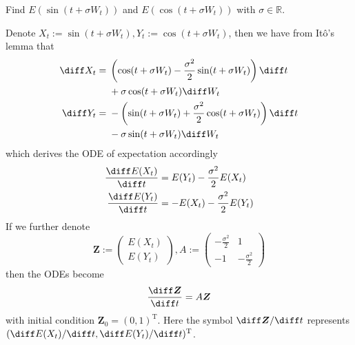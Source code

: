     \problem
    \begin{question}
        Find $E(\sin (t+\sigma W_t))$ and $E(\cos (t+\sigma W_t))$ with $\sigma \in\mathbb R$.
    \end{question}
    \newcommand{\X}{\boldsymbol Z}
    Denote $X_t:=\sin(t+\sigma W_t),Y_t:=\cos(t+\sigma W_t)$,
    then we have from It\^o's lemma that
    \[\begin{aligned}
        \diff X_t&=
        \begin{aligned}[t]
        &\left(\cos(t+\sigma W_t)-\frac{\sigma^2}{2}\sin(t+\sigma W_t)\right)\diff t\\
        &+\sigma\cos(t+\sigma W_t)\diff W_t\\
        \end{aligned}\\
        \diff Y_t&=
        \begin{aligned}[t]
        &-\left(\sin(t+\sigma W_t)+\frac{\sigma^2}{2}\cos(t+\sigma W_t)\right)\diff t\\
        &-\sigma\sin(t+\sigma W_t)\diff W_t
        \end{aligned}
    \end{aligned}\]
    which derives the ODE of expectation accordingly
    \[\begin{aligned}
        \frac{\diff E(X_t)}{\diff t}&=E(Y_t)-\frac{\sigma^2}{2}E(X_t)\\
        \frac{\diff E(Y_t)}{\diff t}&=-E(X_t)-\frac{\sigma^2}{2}E(Y_t)
    \end{aligned}\]
    If we further denote
    \[\X:=\begin{pmatrix}
        E(X_t)\\
        E(Y_t)
    \end{pmatrix},
    A:=\begin{pmatrix}
        -\frac{\sigma^2}{2} & 1\\
        -1 & -\frac{\sigma^2}{2}
    \end{pmatrix}\]
    then the ODEs become
    \[\frac{\diff\X}{\diff t}=A\X\]
    with initial condition $\X_0=(0,1)^\mathrm T$.
    Here the symbol $\diff\X/\diff t$ represents
    $(\diff E(X_t)/\diff t,\diff E(Y_t)/\diff t)^\mathrm T$.

